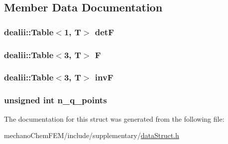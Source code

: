 \subsection{Member Data Documentation}
\subsubsection[{det\-F}]{\setlength{\rightskip}{0pt plus 5cm}dealii\-::\-Table$<$1, T$>$ det\-F}\label{structdeformation_map_aa1ff2dc8fb6f4f6e9125ca026505a977}
\subsubsection[{F}]{\setlength{\rightskip}{0pt plus 5cm}dealii\-::\-Table$<$3, T$>$ F}\label{structdeformation_map_a7934bed7ba72b5e4a3af1fd8a4e14198}
\subsubsection[{inv\-F}]{\setlength{\rightskip}{0pt plus 5cm}dealii\-::\-Table$<$3, T$>$ inv\-F}\label{structdeformation_map_ae40deb9e4616ec6d0b77519e56646ce0}
\subsubsection[{n\-\_\-q\-\_\-points}]{\setlength{\rightskip}{0pt plus 5cm}unsigned int n\-\_\-q\-\_\-points}\label{structdeformation_map_a75df8197cf561419d8ead67373abeafd}


The documentation for this struct was generated from the following file\-:\begin{DoxyCompactItemize}
\item 
mechano\-Chem\-F\-E\-M/include/supplementary/\hyperlink{data_struct_8h}{data\-Struct.\-h}\end{DoxyCompactItemize}
